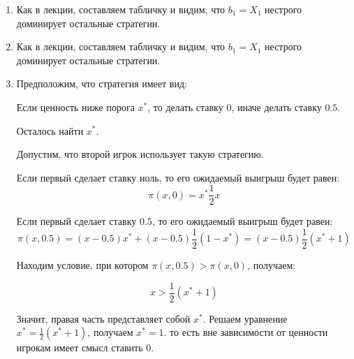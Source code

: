 \begin{enumerate}
\item Как в лекции, составляем табличку и видим, что $ b_{1}=X_{1} $ нестрого доминирует остальные стратегии.


\item  Как в лекции, составляем табличку и видим, что $ b_{1}=X_{1} $ нестрого доминирует остальные стратегии.

\item Предположим, что стратегия имеет вид:

Если ценность ниже порога $ x^{*} $, то делать ставку 0, иначе делать ставку $ 0.5 $.

Осталось найти $ x^{*} $.

Допустим, что второй игрок использует такую стратегию.

Если первый сделает ставку ноль, то его ожидаемый выигрыш будет равен:
\begin{equation}
\pi(x,0)=x^{*}\frac{1}{2}x
\end{equation}

Если первый сделает ставку $0.5$, то его ожидаемый выигрыш будет равен:
\begin{equation}
\pi(x,0.5)=(x-0.5)x^{*}+(x-0.5)\frac{1}{2}(1-x^{*})=(x-0.5)\frac{1}{2}(x^{*}+1)
\end{equation}

Находим условие, при котором $ \pi(x,0.5)>\pi(x,0) $, получаем:

\begin{equation}
x>\frac{1}{2}(x^{*}+1)
\end{equation}

Значит, правая часть представляет собой $ x^{*} $. Решаем уравнение $x^{*}=\frac{1}{2}(x^{*}+1)  $, получаем $ x^{*}=1 $. то есть вне зависимости от ценности игрокам имеет смысл ставить 0.


\end{enumerate}
